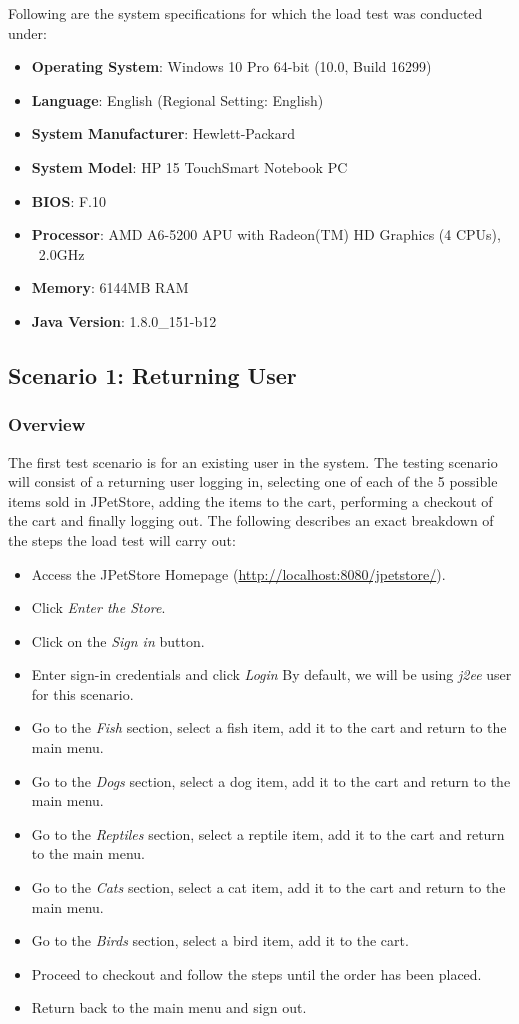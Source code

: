 \documentclass[fontsize=12pt,paper=letter,twoside]{scrartcl}
\begin{document}
\bigskip
\noindent Following are the system specifications for which the load test was conducted under:
\begin{itemize}
\item \textbf{Operating System}: Windows 10 Pro 64-bit (10.0, Build 16299)
\item \textbf{Language}: English (Regional Setting: English)
\item \textbf{System Manufacturer}: Hewlett-Packard
\item \textbf{System Model}: HP 15 TouchSmart Notebook PC
\item \textbf{BIOS}: F.10
\item \textbf{Processor}: AMD A6-5200 APU with Radeon(TM) HD Graphics (4 CPUs), ~2.0GHz
\item \textbf{Memory}: 6144MB RAM
\item \textbf{Java Version}: 1.8.0\_151-b12
\end{itemize}

\newpage
\subsection{Scenario 1: Returning User}

\subsubsection{Overview}
The first test scenario is for an existing user in the system. The testing scenario will consist of a returning user logging in, selecting one of each of the 5 possible items sold in JPetStore, adding the items to the cart, performing a checkout of the cart and finally logging out. The following describes an exact breakdown of the steps the load test will carry out:

\begin{itemize}
\item Access the JPetStore Homepage (\url{http://localhost:8080/jpetstore/}).
\item Click \emph{Enter the Store}.
\item Click on the \emph{Sign in} button.
\item Enter sign-in credentials and click \emph{Login} By default, we will be using \emph{j2ee} user for this scenario.
\item Go to the \emph{Fish} section, select a fish item, add it to the cart and return to the main menu.
\item Go to the \emph{Dogs} section, select a dog item, add it to the cart and return to the main menu.
\item Go to the \emph{Reptiles} section, select a reptile item, add it to the cart and return to the main menu.
\item Go to the \emph{Cats} section, select a cat item, add it to the cart and return to the main menu.
\item Go to the \emph{Birds} section, select a bird item, add it to the cart.
\item Proceed to checkout and follow the steps until the order has been placed.
\item Return back to the main menu and sign out.
\end{itemize}
\end{document}
